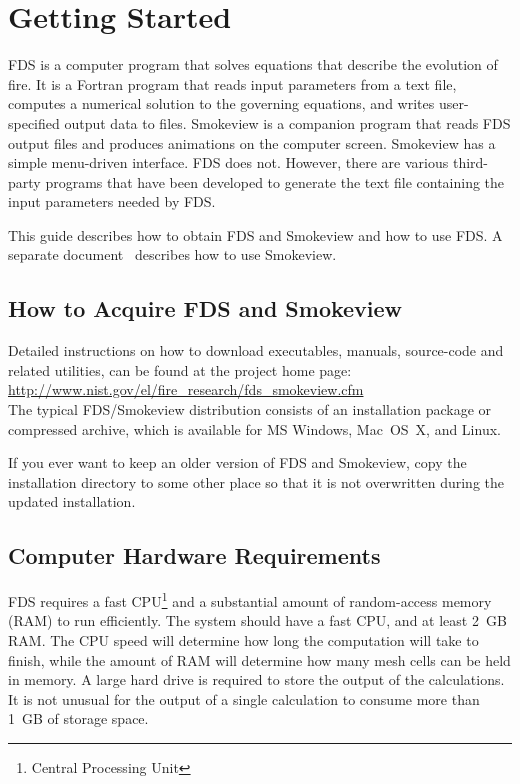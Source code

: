 \documentclass[11pt]{book}
\begin{document}
\chapter{Getting Started}
\label{info:gettingstarted}

FDS is a computer program that solves equations that describe the evolution of fire. It is a Fortran program that reads input parameters from a text file, computes a numerical solution to the governing equations, and writes user-specified output data to files. Smokeview is a companion program that reads FDS output files and produces animations on the computer screen. Smokeview has a simple menu-driven interface. FDS does not. However, there are various third-party programs that have been developed to generate the text file containing the input parameters needed by FDS.

This guide describes how to obtain FDS and Smokeview and how to use FDS. A separate document~\cite{Smokeview_Users_Guide} describes how to use Smokeview.

\section{How to Acquire FDS and Smokeview}
\label{info:acquire}

Detailed instructions on how to download executables, manuals, source-code and related utilities, can be found at the project home page: \\
\href{http://www.nist.gov/el/fire\_research/fds\_smokeview.cfm}{{\ct http://www.nist.gov/el/fire\_research/fds\_smokeview.cfm}} \\
The typical FDS/Smokeview distribution consists of an installation package or compressed archive, which is available for MS Windows, Mac~OS~X, and Linux.

If you ever want to keep an older version of FDS and Smokeview, copy the installation directory to some other place so that it is not overwritten during the updated installation.


\section{Computer Hardware Requirements}

FDS requires a fast CPU\footnote{Central Processing Unit} and a substantial amount of random-access memory (RAM) to run efficiently. The system should have a fast CPU, and at least 2~GB RAM. The CPU speed will determine how long the computation will take to finish, while the amount of RAM will determine how many mesh cells can be held in memory. A large hard drive is required to store the output of the calculations. It is not unusual for the output of a single calculation to consume more than 1~GB of storage space.
\end{document}

